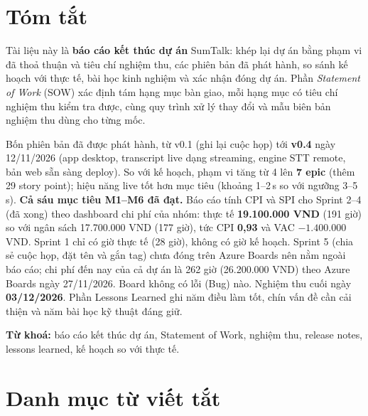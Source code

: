 \documentclass[12pt,a4paper]{report}
\begin{document}
\tableofcontents

\chapter*{Tóm tắt}

Tài liệu này là \textbf{báo cáo kết thúc dự án} SumTalk: khép lại dự án bằng phạm vi đã thoả thuận và tiêu chí
nghiệm thu, các phiên bản đã phát hành, so sánh kế hoạch với thực tế, bài học kinh nghiệm và xác nhận đóng dự án.
Phần \emph{Statement of Work} (SOW) xác định tám hạng mục bàn giao, mỗi hạng mục có tiêu chí nghiệm thu kiểm tra
được, cùng quy trình xử lý thay đổi và mẫu biên bản nghiệm thu dùng cho từng mốc.

Bốn phiên bản đã được phát hành, từ v0.1 (ghi lại cuộc họp) tới \textbf{v0.4} ngày 12/11/2026 (app desktop,
transcript live dạng streaming, engine STT remote, bản web sẵn sàng deploy). So với kế hoạch, phạm vi tăng từ 4 lên
\textbf{7 epic} (thêm 29 story point); hiệu năng live tốt hơn mục tiêu (khoảng 1--2\,s so với ngưỡng 3--5\,s).
\textbf{Cả sáu mục tiêu M1--M6 đã đạt.} Báo cáo tính CPI và SPI cho Sprint 2--4 (đã xong) theo dashboard chi phí của nhóm:
thực tế \textbf{19.100.000 VND} (191 giờ) so với ngân sách 17.700.000 VND (177 giờ), tức CPI \textbf{0,93} và
VAC $-1.400.000$ VND. Sprint 1 chỉ có giờ thực tế (28 giờ), không có giờ kế hoạch. Sprint 5 (chia sẻ cuộc họp, đặt tên và gắn tag) chưa đóng trên Azure Boards nên nằm ngoài báo cáo;
chi phí đến nay của cả dự án là 262 giờ (26.200.000 VND) theo Azure Boards ngày 27/11/2026. Board không có lỗi
(Bug) nào. Nghiệm thu cuối ngày \textbf{03/12/2026}.
Phần Lessons Learned ghi năm điều làm tốt, chín vấn đề cần cải thiện và năm bài học kỹ thuật đáng giữ.

\textbf{Từ khoá:} báo cáo kết thúc dự án, Statement of Work, nghiệm thu, release notes, lessons learned, kế hoạch
so với thực tế.

\chapter*{Danh mục từ viết tắt}
\end{document}
